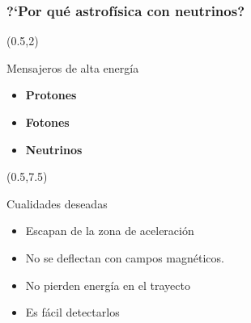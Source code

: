 \begin{frame}
 \frametitle{?`Por qu\'e astrof\'isica con neutrinos?}
 \begin{textblock}{15}(0.5,2)
  \begin{block}{Mensajeros de alta energ\'ia}
   \begin{itemize}\setlength\itemsep{2mm}
    \item {\color<2>{OrangeRed}\textbf<2>{Protones}}
    \item {\textbf<3>{Fotones}}
    \item {\textbf<4->{Neutrinos}}
   \end{itemize}
  \end{block}
 \end{textblock}
 \begin{textblock}{7.5}(0.5,7.5)
  \begin{block}{Cualidades deseadas}
   \begin{itemize}\setlength\itemsep{3mm}
    \item { Escapan de la zona de aceleraci\'on}
    \item { No se deflectan con campos magn\'eticos.}
    \item { No pierden energ\'ia en el trayecto}
    \item { Es f\'acil detectarlos}
   \end{itemize}
  \end{block}
 \end{textblock}
 

\end{frame}
